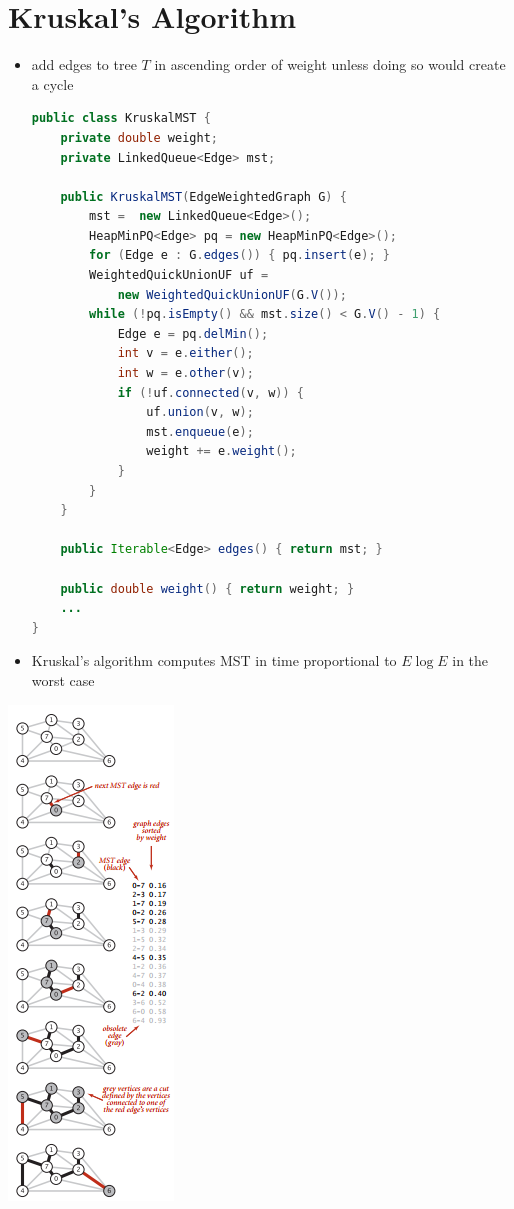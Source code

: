 \documentclass[8pt,a4paper,compress]{beamer}
\begin{document}
\section{Kruskal's Algorithm}
\begin{frame}[fragile]
\begin{minipage}{240pt}
\begin{itemize}
\item add edges to tree $T$ in ascending order of weight unless doing so would create a cycle
\begin{lstlisting}[language=Java]
public class KruskalMST {
    private double weight;  
    private LinkedQueue<Edge> mst;
    
    public KruskalMST(EdgeWeightedGraph G) {
        mst =  new LinkedQueue<Edge>();  
        HeapMinPQ<Edge> pq = new HeapMinPQ<Edge>();
        for (Edge e : G.edges()) { pq.insert(e); }
        WeightedQuickUnionUF uf = 
            new WeightedQuickUnionUF(G.V());
        while (!pq.isEmpty() && mst.size() < G.V() - 1) {
            Edge e = pq.delMin();
            int v = e.either();
            int w = e.other(v);
            if (!uf.connected(v, w)) { 
                uf.union(v, w); 
                mst.enqueue(e); 
                weight += e.weight();
            }
        }
    }

    public Iterable<Edge> edges() { return mst; }

    public double weight() { return weight; }
    ...
}
\end{lstlisting}

\item Kruskal's algorithm computes MST in time proportional to
$E \log E$ in the worst case
\end{itemize}
\end{minipage}%
\begin{minipage}{100pt}
\begin{center}
\includegraphics[scale=0.4]{./figures/mst4.png}


\end{center}
\end{minipage}
\end{frame}
\end{document}
